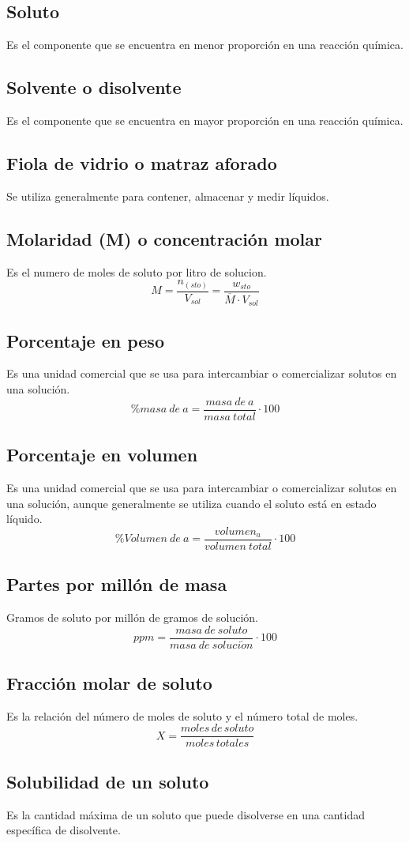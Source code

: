 \documentclass[../main.tex]{subfiles}
\begin{document}
\subsection{Soluto}
Es el componente que se encuentra en menor proporción en una reacción química.\cite{petrucci}

\subsection{Solvente o disolvente}
Es el componente que se encuentra en mayor proporción en una reacción química.\cite{petrucci}

\subsection{Fiola de vidrio o matraz aforado}
Se utiliza generalmente para contener, almacenar y medir líquidos.

\subsection{Molaridad (M) o concentración molar}
Es el numero de moles de soluto por litro de solucion.\cite{chang}
\[M = \frac{n_{(sto)}}{V_{sol}} = \frac{w_{sto}}{\overline{M}\cdot V_{sol}}\]

\subsection{Porcentaje en peso}
Es una unidad comercial que se usa para intercambiar o comercializar solutos en una solución.\cite{chang}
\[\%masa\:de\:a=\frac{masa\:de\:a}{masa\:total}\cdot100\]

\subsection{Porcentaje en volumen}
Es una unidad comercial que se usa para intercambiar o comercializar solutos en una solución, 
aunque generalmente se utiliza cuando el soluto está en estado líquido.\cite{chang}
\[\%Volumen\:de\:a=\frac{volumen_a}{volumen\:total}\cdot100\]

\subsection{Partes por millón de masa}
Gramos de soluto por millón de gramos de solución.\cite{chang}
\[ppm = \frac{masa\:de\:soluto}{masa\:de\:soluci\acute{o}n}\cdot100\]

\subsection{Fracción molar de soluto}
Es la relación del número de moles de soluto y el número total de moles.
\[X = \frac{moles\,de\,soluto}{moles\,totales}\]

\subsection{Solubilidad de un soluto}
Es la cantidad máxima de un soluto que puede disolverse en una cantidad específica de disolvente.
\end{document}
